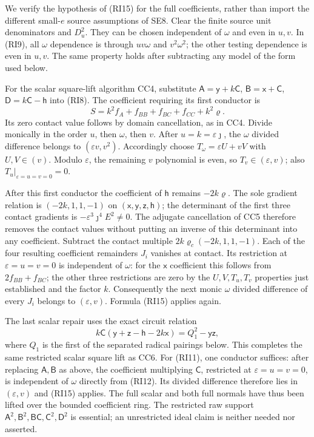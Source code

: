 We verify the hypothesis of (RI15) for the full coefficients, rather
than import the different small-$e$ source assumptions of SE8.
Clear the finite source unit denominators and $D_u^2$. They can be
chosen independent of $\omega$ and even in $u,v$. In (RI9), all
$\omega$ dependence is through $uv\omega$ and $v^2\omega^2$;
the other testing dependence is even in $u,v$. The same property
holds after subtracting any model of the form used below.

For the scalar square-lift algorithm CC4, substitute
$\mathsf A=\mathsf y+k\mathsf C$,
$\mathsf B=\mathsf x+\mathsf C$,
$\mathsf D=k\mathsf C-\mathsf h$ into (RI8).
The coefficient requiring its first conductor is
\[
 S=k^2f_A+f_{BB}+f_{BC}+f_{CC}+k^2\varrho.
\]
Its zero contact value follows by domain cancellation, as in CC4.
Divide monically in the order $u$, then $\omega$, then $v$.
After $u=k=\varepsilon\jmath$, the $\omega$ divided difference
belongs to $(\varepsilon v,v^2)$. Accordingly choose
$T_\omega=\varepsilon U+vV$ with $U,V\in(v)$.
Modulo $\varepsilon$, the remaining $v$ polynomial is even, so
$T_v\in(\varepsilon,v)$; also
$T_u|_{\varepsilon=u=v=0}=0$.

After this first conductor the coefficient of $\mathsf h$ remains
$-2k\varrho$. The sole gradient relation is
$(-2k,1,1,-1)$ on
$(\mathsf x,\mathsf y,\mathsf z,\mathsf h)$; the determinant of
the first three contact gradients is
$-\varepsilon^3\jmath^4E^2\ne0$. The adjugate cancellation of
CC5 therefore removes the contact values without putting an inverse
of this determinant into any coefficient. Subtract the contact
multiple $2k\varrho_c(-2k,1,1,-1)$.
Each of the four resulting coefficient remainders $J_i$ vanishes at
contact. Its restriction at $\varepsilon=u=v=0$ is independent of
$\omega$: for the $\mathsf x$ coefficient this follows from
$2f_{BB}+f_{BC}$; the other three restrictions are zero by the
$U,V,T_u,T_v$ properties just established and the factor $k$.
Consequently the next monic $\omega$ divided difference of every
$J_i$ belongs to $(\varepsilon,v)$. Formula (RI15) applies again.

The last scalar repair uses the exact circuit relation
\[
 k\mathsf C(\mathsf y+\mathsf z-\mathsf h-2k\mathsf x)
       =Q_1^2-\mathsf y\mathsf z,
\]
where $Q_1$ is the first of the separated radical pairings below.
This completes the same restricted scalar square lift as CC6.
For (RI11), one conductor suffices: after replacing
$\mathsf A,\mathsf B$ as above, the coefficient multiplying
$\mathsf C$, restricted at $\varepsilon=u=v=0$, is independent of
$\omega$ directly from (RI12). Its divided difference therefore
lies in $(\varepsilon,v)$ and (RI15) applies. The full scalar and
both full normals have thus been lifted over the bounded coefficient
ring. The restricted raw support $\mathsf A^2,\mathsf B^2,
\mathsf B\mathsf C,\mathsf C^2,\mathsf D^2$ is essential;
an unrestricted ideal claim is neither needed nor asserted.

